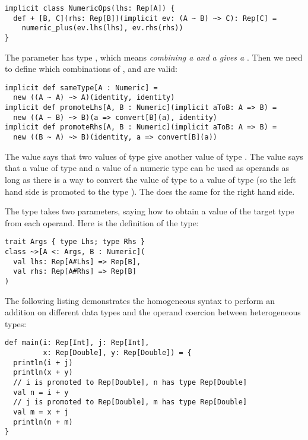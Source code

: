 \documentclass[american,english,runningheads]{llncs}
\begin{document}
\begin{lstlisting}
implicit class NumericOps(lhs: Rep[A]) {
  def + [B, C](rhs: Rep[B])(implicit ev: (A ~ B) ~> C): Rep[C] =
    numeric_plus(ev.lhs(lhs), ev.rhs(rhs))
}
\end{lstlisting}

The  parameter has type , which means \emph{combining a  and a  gives a }. Then we need to define which combinations of ,  and  are valid:

\begin{lstlisting}
implicit def sameType[A : Numeric] =
  new ((A ~ A) ~> A)(identity, identity)
implicit def promoteLhs[A, B : Numeric](implicit aToB: A => B) =
  new ((A ~ B) ~> B)(a => convert[B](a), identity)
implicit def promoteRhs[A, B : Numeric](implicit aToB: A => B) =
  new ((B ~ A) ~> B)(identity, a => convert[B](a))
\end{lstlisting}

The  value says that two values of type  give another value of type . The  value says that a value of type  and a value of a numeric type  can be used as operands as long as there is a way to convert the value of type  to a value of type  (so the left hand side is promoted to the type ). The  does the same for the right hand side.

The \code{\~\>} type takes two parameters, saying how to obtain a value of the target type from each operand. Here is the definition of the \code{\~\>} type:

\begin{lstlisting}
trait Args { type Lhs; type Rhs }
class ~>[A <: Args, B : Numeric](
  val lhs: Rep[A#Lhs] => Rep[B],
  val rhs: Rep[A#Rhs] => Rep[B]
)
\end{lstlisting}

The following listing demonstrates the homogeneous syntax to perform an addition on different data types and the operand coercion between heterogeneous types:

\begin{lstlisting}
def main(i: Rep[Int], j: Rep[Int],
         x: Rep[Double], y: Rep[Double]) = {
  println(i + j)
  println(x + y)
  // i is promoted to Rep[Double], n has type Rep[Double]
  val n = i + y
  // j is promoted to Rep[Double], m has type Rep[Double]
  val m = x + j
  println(n + m)
}
\end{lstlisting}
\end{document}
